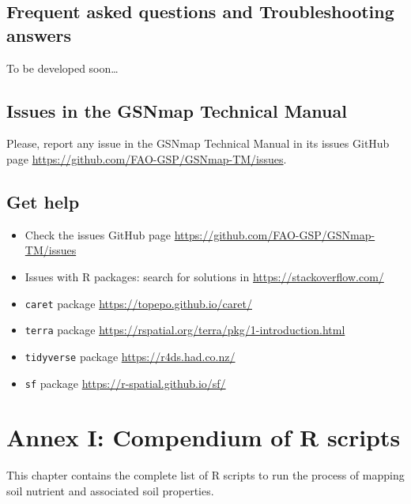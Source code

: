 \documentclass[
  10pt,
  b5paper,
  oneside]{book}
\providecommand{\tightlist}{%
  \setlength{\itemsep}{0pt}\setlength{\parskip}{0pt}}
\begin{document}
\hypertarget{frequent-asked-questions-and-troubleshooting-answers}{%
\section{Frequent asked questions and Troubleshooting answers}\label{frequent-asked-questions-and-troubleshooting-answers}}

To be developed soon\ldots{}

\hypertarget{issues-in-the-gsnmap-technical-manual}{%
\section{Issues in the GSNmap Technical Manual}\label{issues-in-the-gsnmap-technical-manual}}

Please, report any issue in the GSNmap Technical Manual in its issues GitHub page \url{https://github.com/FAO-GSP/GSNmap-TM/issues}.

\hypertarget{get-help}{%
\section{Get help}\label{get-help}}

\begin{itemize}
\tightlist
\item
  Check the issues GitHub page \url{https://github.com/FAO-GSP/GSNmap-TM/issues}
\item
  Issues with R packages: search for solutions in \url{https://stackoverflow.com/}
\item
  \texttt{caret} package \url{https://topepo.github.io/caret/}
\item
  \texttt{terra} package \url{https://rspatial.org/terra/pkg/1-introduction.html}
\item
  \texttt{tidyverse} package \url{https://r4ds.had.co.nz/}
\item
  \texttt{sf} package \url{https://r-spatial.github.io/sf/}
\end{itemize}

\hypertarget{annex-i-compendium-of-r-scripts}{%
\chapter*{Annex I: Compendium of R scripts}\label{annex-i-compendium-of-r-scripts}}

This chapter contains the complete list of R scripts to run the process of mapping soil nutrient and associated soil properties.
\end{document}
